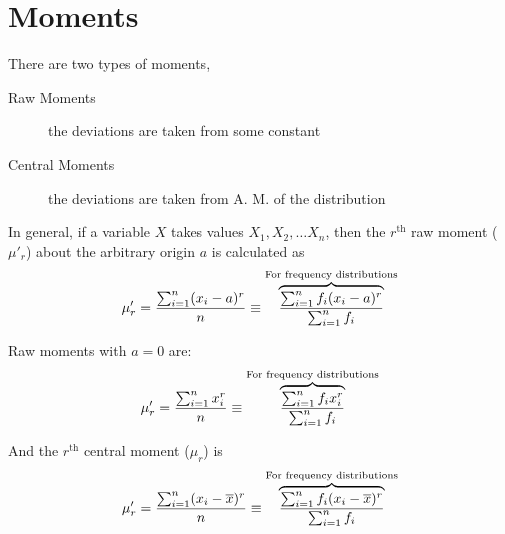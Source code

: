 \documentclass[
10pt, %
a4paper, %
]{report}
\begin{document}
\section*{Moments}
There are two types of moments,
\begin{description}
\item[Raw Moments] the deviations are taken from some constant
\item[Central Moments] the deviations are taken from A. M. of the distribution
\end{description}
In general, if a variable \(X\) takes values \(X_1, X_2, \dots X_n\),
then the \(r^\text{th}\) raw moment (\(\mu'_r\)) about the arbitrary origin \(a\) is calculated as
\[\mu'_r = \frac{\sum_{i=1}^{n} (x_i-a)^r}{n} \equiv \overbrace{\frac{\sum_{i=1}^{n} f_i  (x_i-a)^r}{\sum_{i=1}^{n} f_i}}^{\text{For frequency distributions}}\]

Raw moments with \(a=0\) are:
\[\mu'_r = \frac{\sum_{i=1}^{n} x_i^r}{n} \equiv \overbrace{\frac{\sum_{i=1}^{n} f_i  x_i^r}{\sum_{i=1}^{n} f_i}}^{\text{For frequency distributions}}\]

And the \(r^\text{th}\) central moment (\(\mu_r\)) is
\[\mu'_r = \frac{\sum_{i=1}^{n} (x_i-\overline{x})^r}{n} \equiv \overbrace{\frac{\sum_{i=1}^{n} f_i  (x_i-\overline{x})^r}{\sum_{i=1}^{n} f_i}}^{\text{For frequency distributions}}\]
\end{document}
